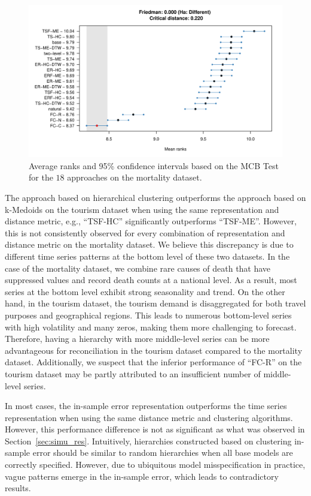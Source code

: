 \documentclass[a4paper,review,12pt,authoryear]{elsarticle}
\begin{document}
\begin{figure}
    \centering
    \includegraphics[width=\textwidth]{figures/mortality_mcb.pdf}
    \caption{\label{fig:mortality_mcb}Average ranks and 95\% confidence intervals based on the MCB Test for the $18$ approaches on the mortality dataset.}
\end{figure}

The approach based on hierarchical clustering outperforms the approach based on k-Medoids on the tourism dataset when using the same representation and distance metric, e.g., ``TSF-HC'' significantly outperforms ``TSF-ME''. However, this is not consistently observed for every combination of representation and distance metric on the mortality dataset. We believe this discrepancy is due to different time series patterns at the bottom level of these two datasets.
In the case of the mortality dataset, we combine rare causes of death that have suppressed values and record death counts at a national level. As a result, most series at the bottom level exhibit strong seasonality and trend. On the other hand, in the tourism dataset, the tourism demand is disaggregated for both travel purposes and geographical regions. This leads to numerous bottom-level series with high volatility and many zeros, making them more challenging to forecast.
Therefore, having a hierarchy with more middle-level series can be more advantageous for reconciliation in the tourism dataset compared to the mortality dataset. Additionally, we suspect that the inferior performance of ``FC-R'' on the tourism dataset may be partly attributed to an insufficient number of middle-level series.

In most cases, the in-sample error representation outperforms the time series representation when using the same distance metric and clustering algorithms. However, this performance difference is not as significant as what was observed in Section~\ref{sec:simu_res}. Intuitively, hierarchies constructed based on clustering in-sample error should be similar to random hierarchies when all base models are correctly specified. However, due to ubiquitous model misspecification in practice, vague patterns emerge in the in-sample error, which leads to contradictory results.
\end{document}
